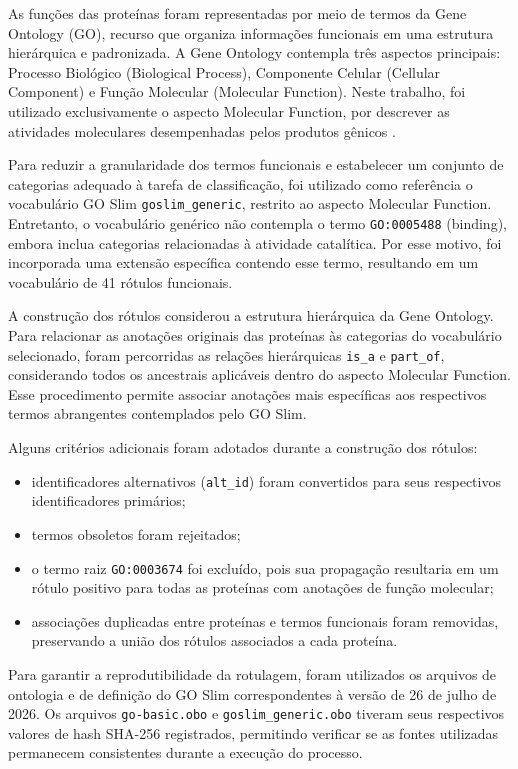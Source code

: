 As funções das proteínas foram representadas por meio de termos da Gene Ontology (GO), recurso que organiza informações funcionais em uma estrutura hierárquica e padronizada. A Gene Ontology contempla três aspectos principais: Processo Biológico (Biological Process), Componente Celular (Cellular Component) e Função Molecular (Molecular Function). Neste trabalho, foi utilizado exclusivamente o aspecto Molecular Function, por descrever as atividades moleculares desempenhadas pelos produtos gênicos \cite{goconsortium2026}.

Para reduzir a granularidade dos termos funcionais e estabelecer um conjunto de categorias adequado à tarefa de classificação, foi utilizado como referência o vocabulário GO Slim \texttt{goslim\_generic}, restrito ao aspecto Molecular Function. Entretanto, o vocabulário genérico não contempla o termo \texttt{GO:0005488} (binding), embora inclua categorias relacionadas à atividade catalítica. Por esse motivo, foi incorporada uma extensão específica contendo esse termo, resultando em um vocabulário de 41 rótulos funcionais.

A construção dos rótulos considerou a estrutura hierárquica da Gene Ontology. Para relacionar as anotações originais das proteínas às categorias do vocabulário selecionado, foram percorridas as relações hierárquicas \texttt{is\_a} e \texttt{part\_of}, considerando todos os ancestrais aplicáveis dentro do aspecto Molecular Function. Esse procedimento permite associar anotações mais específicas aos respectivos termos abrangentes contemplados pelo GO Slim.

Alguns critérios adicionais foram adotados durante a construção dos rótulos:

\begin{itemize}
    \item identificadores alternativos (\texttt{alt\_id}) foram convertidos para seus respectivos identificadores primários;
    \item termos obsoletos foram rejeitados;
    \item o termo raiz \texttt{GO:0003674} foi excluído, pois sua propagação resultaria em um rótulo positivo para todas as proteínas com anotações de função molecular;
    \item associações duplicadas entre proteínas e termos funcionais foram removidas, preservando a união dos rótulos associados a cada proteína.
\end{itemize}

Para garantir a reprodutibilidade da rotulagem, foram utilizados os arquivos de ontologia e de definição do GO Slim correspondentes à versão de 26 de julho de 2026. Os arquivos \texttt{go-basic.obo} e \texttt{goslim\_generic.obo} tiveram seus respectivos valores de hash SHA-256 registrados, permitindo verificar se as fontes utilizadas permanecem consistentes durante a execução do processo.

